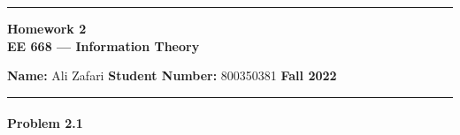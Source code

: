 \documentclass[12pt, letterpaper]{scrartcl}
\begin{document}
    \begin{center}
    	\hrule
    	\vspace{0.4cm}
    	{\textbf { {\large Homework 2} \\ EE 668 --- Information Theory}}
    \end{center}
    { \textbf{Name:} Ali Zafari \hspace{\fill} \textbf{Student Number:} 800350381 \hspace{\fill} \textbf{Fall 2022} } \newline\hrule

\paragraph*{Problem 2.1} \hfill\newline
\end{document}
